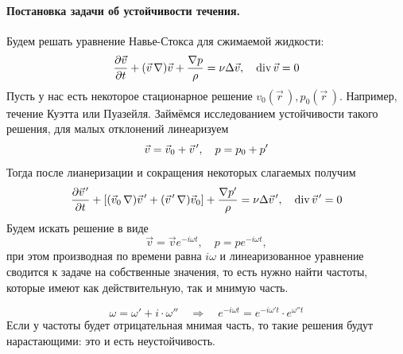 \paragraph{Постановка задачи об устойчивости течения.} Будем решать 
уравнение Навье-Стокса для сжимаемой жидкости:
\begin{equation}
    \pdv{\vec{v}}{t}+ (\vec{v}\,\nabla) \vec{v} + \frac{\nabla p}{\rho}=
    \nu \Delta \vec{v}, \quad \operatorname{div} \vec{v} = 0
\end{equation}
Пусть у нас есть некоторое стационарное решение 
$v_0(\vec{r}\,), p_0(\vec{r}\,)$.
Например, течение Куэтта или Пуазейля. Займёмся исследованием
устойчивости такого решения, для малых отклонений линеаризуем
\begin{equation}
    \vec{v}=\vec{v}_0+\pvec{v}', \quad p = p_0 +p'
\end{equation}
Тогда после лианеризации и сокращения некоторых слагаемых получим
\begin{equation}
    \pdv{\pvec{v}'}{t}+\qty[(\vec{v}_0\,\nabla) \pvec{v}'+
        (\pvec{v}'\,\nabla)\vec{v}_0] + \frac{\nabla p'}{\rho}=
    \nu \Delta \pvec{v}', \quad \Div \pvec{v}' = 0
\end{equation}
Будем искать решение в виде
\begin{equation}
    \vec{v} = \vec{v}e^{-i\omega t}, \quad
    p = p e^{-i\omega t},
\end{equation}
при этом производная по времени равна $i \omega$  и линеаризованное уравнение сводится к задаче на собственные значения, то есть нужно найти частоты, которые имеют как действительную, так и мнимую часть. 

\begin{equation}
    \omega = \omega'+i\cdot\omega''
    \quad\Rightarrow\quad 
    e^{-i\omega t} = e^{-i\omega' t}\cdot e^{\omega'' t} 
\end{equation}
Если у частоты
будет отрицательная мнимая часть, то такие решения будут нарастающими:
это и есть неустойчивость.

